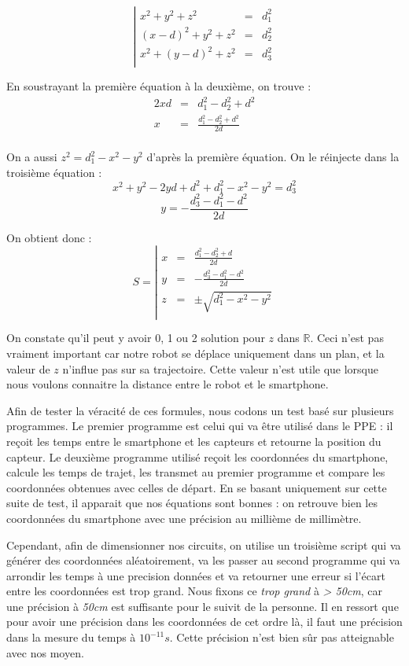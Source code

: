\[
    \left|
    \begin{array}{rcl}
        x^2 + y^2 + z^2 &=& d_1^2 \\
        (x-d)^2 + y^2 + z^2 &=& d_2^2 \\
        x^2 + (y-d)^2 + z^2 &=& d_3^2 \\
    \end{array}
    \right.
\]

En soustrayant la première équation à la deuxième, on trouve :
\[
    \begin{array}{rcl}
        2xd &=& d_1^2-d_2^2 + d^2 \\
        x &=& \frac{d_1^2-d_2^2 + d^2}{2d} \\
    \end{array}
\]

\newpage
On a aussi $z^2 = d_1^2-x^2-y^2$ d'après la première équation. On le réinjecte dans la troisième équation :
\[ x^2+y^2-2yd+d^2+d_1^2-x^2-y^2 = d_3^2 \]
\[ y = -\frac{d_3^2-d_1^2-d^2}{2d} \]

On obtient donc :
\[
    S=\left|
    \begin{array}{rcl}
        x &=& \frac{d_1^2-d_2^2+d}{2d} \\
        y &=& -\frac{d_3^2-d_1^2-d^2}{2d} \\
        z &=& \pm\sqrt{d_1^2-x^2-y^2} \\
    \end{array}
    \right.
\]

On constate qu'il peut y avoir 0, 1 ou 2 solution pour $z$ dans $\mathbb{R}$. Ceci n'est pas vraiment important car notre robot se déplace uniquement dans un plan, et la valeur de $z$ n'influe pas sur sa trajectoire. Cette valeur n'est utile que lorsque nous voulons connaitre la distance entre le robot et le smartphone.

Afin de tester la véracité de ces formules, nous codons un test basé sur plusieurs programmes. Le premier programme est celui qui va être utilisé dans le PPE : il reçoit les temps entre le smartphone et les capteurs et retourne la position du capteur. Le deuxième programme utilisé reçoit les coordonnées du smartphone, calcule les temps de trajet, les transmet au premier programme et compare les coordonnées obtenues avec celles de départ. En se basant uniquement sur cette suite de test, il apparait que nos équations sont bonnes : on retrouve bien les coordonnées du smartphone avec une précision au millième de millimètre.

Cependant, afin de dimensionner nos circuits, on utilise un troisième script qui va générer des coordonnées aléatoirement, va les passer au second programme qui va arrondir les temps à une precision données et va retourner une erreur si l'écart entre les coordonnées est trop grand. Nous fixons ce \emph{trop grand} à \emph{> 50cm}, car une précision à \emph{50cm} est suffisante pour le suivit de la personne. Il en ressort que pour avoir une précision dans les coordonnées de cet ordre là, il faut une précision dans la mesure du temps à $10^{-11}s$. Cette précision n'est bien sûr pas atteignable avec nos moyen.

